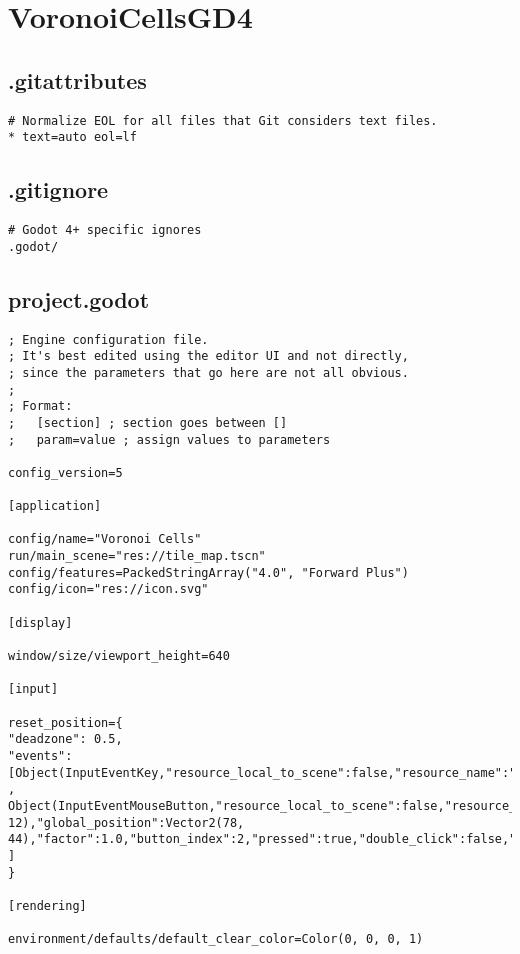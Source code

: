 \section{VoronoiCellsGD4}

\subsection{.gitattributes}

\begin{lstlisting}
# Normalize EOL for all files that Git considers text files.
* text=auto eol=lf
\end{lstlisting}

\subsection{.gitignore}

\begin{lstlisting}
# Godot 4+ specific ignores
.godot/
\end{lstlisting}

\subsection{project.godot}

\begin{lstlisting}
; Engine configuration file.
; It's best edited using the editor UI and not directly,
; since the parameters that go here are not all obvious.
;
; Format:
;   [section] ; section goes between []
;   param=value ; assign values to parameters

config_version=5

[application]

config/name="Voronoi Cells"
run/main_scene="res://tile_map.tscn"
config/features=PackedStringArray("4.0", "Forward Plus")
config/icon="res://icon.svg"

[display]

window/size/viewport_height=640

[input]

reset_position={
"deadzone": 0.5,
"events": [Object(InputEventKey,"resource_local_to_scene":false,"resource_name":"","device":-1,"window_id":0,"alt_pressed":false,"shift_pressed":false,"ctrl_pressed":false,"meta_pressed":false,"pressed":false,"keycode":71,"physical_keycode":0,"key_label":0,"unicode":103,"echo":false,"script":null)
, Object(InputEventMouseButton,"resource_local_to_scene":false,"resource_name":"","device":-1,"window_id":0,"alt_pressed":false,"shift_pressed":false,"ctrl_pressed":false,"meta_pressed":false,"button_mask":2,"position":Vector2(75, 12),"global_position":Vector2(78, 44),"factor":1.0,"button_index":2,"pressed":true,"double_click":false,"script":null)
]
}

[rendering]

environment/defaults/default_clear_color=Color(0, 0, 0, 1)
\end{lstlisting}

